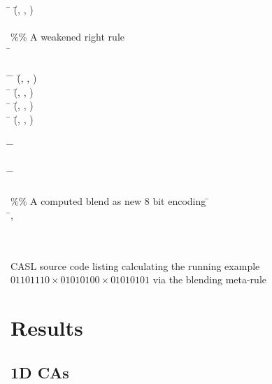 \documentclass{AISB2008}
\begin{document}
\begin{listing}
{\begin{hetcasl}
\> \Ax{\bullet} \= (\=, , ) \Ax{=} \\
\\
\%\% A weakened right rule \\
\SPEC \= \Ax{=}\\
\> \\
\THEN \=\Ax{\bullet} \= (\=, , ) \Ax{=} \\
\> \Ax{\bullet} \= (\=, , ) \Ax{=} \\
\> \Ax{\bullet} \= (\=, , ) \Ax{=} \\
\> \Ax{\bullet} \= (\=, , ) \Ax{=} \\
\\
\VIEW \= \Ax{:} \=  \\
\\
\VIEW \= \Ax{:} \=  \\
\\
\%\% A computed blend as new 8 bit encoding
\SPEC \= \Ax{=}\\
\>  \=, \\
\AND {}\\
\AND {}\\
\end{hetcasl}
}
\caption{CASL source code listing calculating the running example $01101110\times 01010100\times 01010101$ via the blending meta-rule\label{CASL-listing}}
\end{listing}

\newpage



\section{Results}
\subsection{1D CAs} \label{1d-results}
\end{document}
